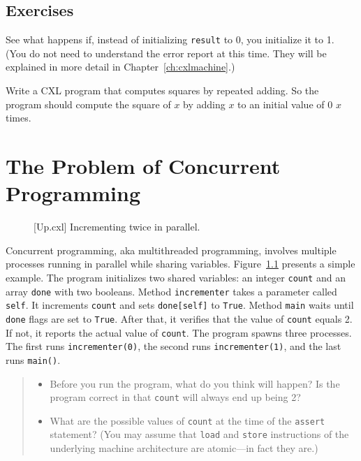 \documentclass{report}
\newenvironment{code}{
\tcolorbox
}{
\endtcolorbox
}
\begin{document}
\section*{Exercises}
\begin{problems}
\item See what happens if, instead of initializing \texttt{result} to 0,
you initialize it to 1.  (You do not need to understand the error report at this time.  They will be explained in more detail in Chapter~\ref{ch:cxlmachine}.)
\item Write a CXL program that computes squares by repeated adding.  So the program
should compute the square of $x$ by adding $x$ to an initial value of 0 $x$ times.
\end{problems}

\chapter{The Problem of Concurrent Programming}
\label{ch:concurrent}

\begin{figure}
\begin{code}
\end{code}
\caption{[Up.cxl] Incrementing twice in parallel.}
\label{fig:inc}
\end{figure}

Concurrent programming, aka multithreaded programming, involves multiple
processes
running in parallel while sharing variables.
Figure~\ref{fig:inc} presents a simple example.
The program
initializes two shared variables: an integer \texttt{count} and
an array \texttt{done} with two booleans.
Method \texttt{incrementer} takes a parameter called \texttt{self}.
It increments \texttt{count} and sets \texttt{done[self]} to \texttt{True}.
Method \texttt{main} waits until \texttt{done} flags are set to \texttt{True}.
After that, it verifies that the value of \texttt{count} equals 2.  If not,
it reports the actual value of \texttt{count}.
The program spawns three processes.
The first runs \texttt{incrementer(0)}, the second runs
\texttt{incrementer(1)}, and the last runs \texttt{main()}.

\begin{quote}
\begin{itemize}
\item Before you run the program, what do you think will happen?  Is the
program correct in that \texttt{count} will always end up being 2?
\item What are the possible values of \texttt{count} at the time of the
\texttt{assert} statement?
(You may assume that \texttt{load} and \texttt{store} instructions of the
underlying machine architecture are atomic---in fact they are.)
\end{itemize}
\end{quote}
\end{document}
